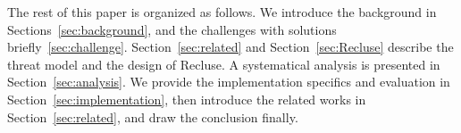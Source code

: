 The rest of this paper is organized as follows. We introduce the background in Sections~\ref{sec:background}, and the challenges with solutions briefly~\ref{sec:challenge}. Section~\ref{sec:related} and Section~\ref{sec:Recluse} describe the threat model and the design of Recluse. A systematical analysis is presented in Section~\ref{sec:analysis}. We provide the implementation specifics and evaluation in Section~\ref{sec:implementation}, then introduce the related works in Section~\ref{sec:related}, and draw the conclusion finally.





